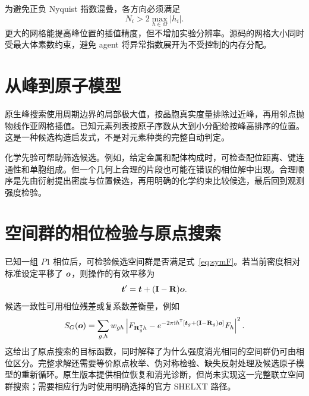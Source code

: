 为避免正负 Nyquist 指数混叠，各方向必须满足
\begin{equation}
N_i>2\max_{h\in\Omega}|h_i|.
\end{equation}
更大的网格能提高峰位置的插值精度，但不增加实验分辨率。源码的网格大小同时受最大体素数约束，避免 agent 将异常指数展开为不受控制的内存分配。

\section{从峰到原子模型}
原生峰搜索使用周期边界的局部极大值，按晶胞真实度量排除过近峰，再用邻点抛物线作亚网格插值。已知元素列表按原子序数从大到小分配给按峰高排序的位置。这是一种候选构造启发式，不是对元素种类的完整自动判定。

化学先验可帮助筛选候选。例如，给定金属和配体构成时，可检查配位距离、键连通性和单胞组成。但一个几何上合理的片段也可能在错误的相位解中出现。合理顺序是先由衍射提出密度与位置候选，再用明确的化学约束比较候选，最后回到观测强度检验。

\section{空间群的相位检验与原点搜索}
已知一组 $P1$ 相位后，可检验候选空间群是否满足式~\eqref{eq:symF}。若当前密度相对标准设定平移了 $\bm{o}$，则操作的有效平移为
\begin{equation}
\bm{t}'=\bm{t}+(\mathbf{I}-\mathbf{R})\bm{o}.
\end{equation}
候选一致性可用相位残差或复系数差衡量，例如
\begin{equation}
S_G(\bm{o})=\sum_{g,h}w_{gh}
\left|F_{\mathbf{R}_g^{\mathsf T}h}
-e^{-2\pi\mathrm{i} h^{\mathsf T}[\bm{t}_g+(\mathbf{I}-\mathbf{R}_g)\bm{o}]}F_h\right|^2.
\end{equation}
这给出了原点搜索的目标函数，同时解释了为什么强度消光相同的空间群仍可由相位区分。完整求解还需要等价原点枚举、伪对称检验、缺失反射处理及候选原子模型的重新循环。原生版本提供相位恢复和消光诊断，但尚未实现这一完整联立空间群搜索；需要相应行为时使用明确选择的官方 SHELXT 路径。

